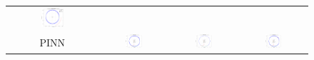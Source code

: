 \documentclass[12pt,a4paper]{article}
\begin{document}
\begin{figure}[H]
\begin{tabular}{cccc}
      \includegraphics[width=0.27\textwidth]{../inference_results/test/LSTM/two_body/500/full_trajectory_spaceship_0.png} \\
      PINN &
      \includegraphics[width=0.27\textwidth]{../inference_results/train/PINN/two_body/500/full_trajectory_spaceship_0.png} &
      \includegraphics[width=0.27\textwidth]{../inference_results/val/PINN/two_body/500/full_trajectory_spaceship_0.png} &
      \includegraphics[width=0.27\textwidth]{../inference_results/test/PINN/two_body/500/full_trajectory_spaceship_0.png}
  \end{tabular}
\end{figure}
\end{document}
